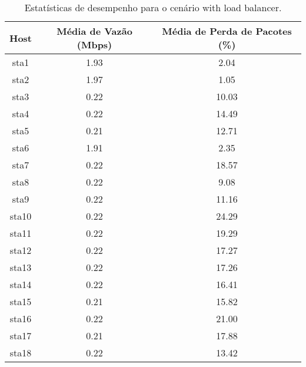 \begin{table}[htbp]
    \centering
    \label{tab:with_load_balancer_stats}
    \begin{tabular}{|c|c|c|}
        \hline
        \textbf{Host} & \textbf{Média de Vazão (Mbps)} & \textbf{Média de Perda de Pacotes (\%)} \\ \hline
        sta1 & 1.93 & 2.04 \\ \hline
        sta2 & 1.97 & 1.05 \\ \hline
        sta3 & 0.22 & 10.03 \\ \hline
        sta4 & 0.22 & 14.49 \\ \hline
        sta5 & 0.21 & 12.71 \\ \hline
        sta6 & 1.91 & 2.35 \\ \hline
        sta7 & 0.22 & 18.57 \\ \hline
        sta8 & 0.22 & 9.08 \\ \hline
        sta9 & 0.22 & 11.16 \\ \hline
        sta10 & 0.22 & 24.29 \\ \hline
        sta11 & 0.22 & 19.29 \\ \hline
        sta12 & 0.22 & 17.27 \\ \hline
        sta13 & 0.22 & 17.26 \\ \hline
        sta14 & 0.22 & 16.41 \\ \hline
        sta15 & 0.21 & 15.82 \\ \hline
        sta16 & 0.22 & 21.00 \\ \hline
        sta17 & 0.21 & 17.88 \\ \hline
        sta18 & 0.22 & 13.42 \\ \hline
    \end{tabular}
    \caption{Estatísticas de desempenho para o cenário with load balancer.}
\end{table}

